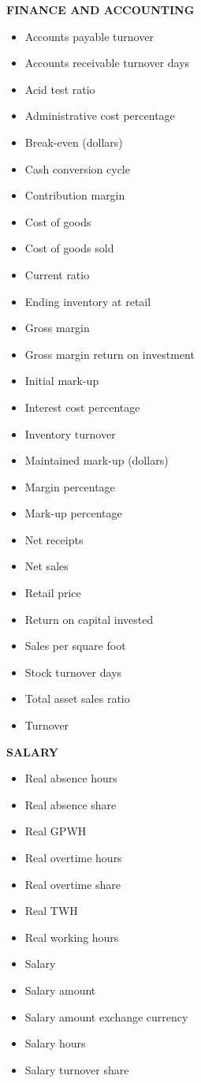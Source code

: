 \documentclass[]{book}
\providecommand{\tightlist}{%
  \setlength{\itemsep}{0pt}\setlength{\parskip}{0pt}}
\begin{document}
\textbf{FINANCE AND ACCOUNTING }

\begin{itemize}
\tightlist
\item
  Accounts payable turnover
\item
  Accounts receivable turnover days
\item
  Acid test ratio
\item
  Administrative cost percentage
\item
  Break-even (dollars)
\item
  Cash conversion cycle
\item
  Contribution margin
\item
  Cost of goods
\item
  Cost of goods sold
\item
  Current ratio
\item
  Ending inventory at retail
\item
  Gross margin
\item
  Gross margin return on investment
\item
  Initial mark-up
\item
  Interest cost percentage
\item
  Inventory turnover
\item
  Maintained mark-up (dollars)
\item
  Margin percentage
\item
  Mark-up percentage
\item
  Net receipts
\item
  Net sales
\item
  Retail price
\item
  Return on capital invested
\item
  Sales per square foot
\item
  Stock turnover days
\item
  Total asset sales ratio
\item
  Turnover
\end{itemize}

\textbf{SALARY }

\begin{itemize}
\tightlist
\item
  Real absence hours
\item
  Real absence share
\item
  Real GPWH
\item
  Real overtime hours
\item
  Real overtime share
\item
  Real TWH
\item
  Real working hours
\item
  Salary
\item
  Salary amount
\item
  Salary amount exchange currency
\item
  Salary hours
\item
  Salary turnover share
\end{itemize}
\end{document}

